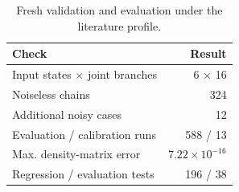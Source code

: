 \begin{table}[t]
\centering
\caption{Fresh validation and evaluation under the literature profile.}
\label{tab:qucl-validation}
\small
\begin{tabular}{@{}lr@{}}
\toprule
Check & Result \\
\midrule
Input states $\times$ joint branches & 6 $\times$ 16 \\
Noiseless chains & 324 \\
Additional noisy cases & 12 \\
Evaluation / calibration runs & 588 / 13 \\
Max. density-matrix error & $7.22\times 10^{-16}$ \\
Regression / evaluation tests & 196 / 38 \\
\bottomrule
\end{tabular}
\end{table}
